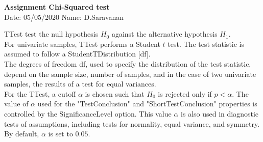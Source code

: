 \documentclass[a4paper,10pt,openright]{report}
\begin{document}
\singlespacing
\pagestyle{plain}

\begin{center}
\textbf{Assignment Chi-Squared test} \\
Date: 05/05/2020 \hspace{2mm} Name: D.Saravanan
\end{center}

\vspace{10px}

TTest test the null hypothesis $H_{0}$ against the alternative hypothesis $H_{1}$. \\

For univariate samples, TTest performs a Student $t$ test. The test statistic is assumed to
follow a StudentTDistribution [df]. \\ 

The degrees of freedom df, used to specify the distribution of the test statistic, depend on
the sample size, number of samples, and in the case of two univariate samples, the results 
of a test for equal variances. \\ 

For the TTest, a cutoff $\alpha$ is chosen such that $H_{0}$ is rejected only if $p < \alpha
$. The value of $\alpha$ used for the "TestConclusion" and "ShortTestConclusion" properties 
is controlled by the SignificanceLevel option. This value $\alpha$ is also used in diagnostic
tests of assumptions, including tests for normality, equal variance, and symmetry. By 
default, $\alpha$ is set to $0.05$. 
\end{document}
